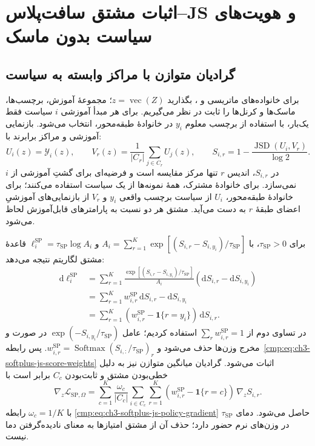 \section{اثبات مشتق سافت‌پلاس--JS و هویت‌های سیاست بدون ماسک}
\label{app:ch3-softplus-logpolicy-proofs}
\subsection{گرادیان متوازن با مراکز وابسته به سیاست}
\label{app:ch3-softplus-gradient-proof}
برای خانواده‌های ماتریسی  و ،
بگذارید $z=\operatorname{vec}(Z)$؛
مجموعهٔ آموزش، برچسب‌ها، ماسک‌ها و کرنل‌ها را ثابت
در نظر می‌گیریم. برای هر مبدأ آموزشی $i$
سیاست فقط یک‌بار، با استفاده از برچسب معلوم
$y_i$ در خانوادهٔ طبقه‌محور، انتخاب می‌شود.
بازنمایی آموزشی و مراکز برابرند با:
\[
U_i(z)=\mathscr Y_i(z),\qquad
V_r(z)=\frac1{|C_r|}\sum_{j\in C_r}U_j(z),\qquad
S_{i,r}=1-\frac{\operatorname{JSD}(U_i,V_r)}{\log2}.
\]
در $S_{i,r}$، اندیس $r$ تنها مرکز مقایسه
است و فرضیه‌ای برای گشتِ آموزشی از $i$
نمی‌سازد. برای خانوادهٔ مشترک، همهٔ
نمونه‌ها از یک سیاست استفاده می‌کنند؛
برای خانوادهٔ طبقه‌محور، $U_i$ از
سیاست برچسب واقعی $y_i$ و $V_r$
از بازنمایی‌های آموزشیِ اعضای طبقهٔ
$r$ به دست می‌آید. مشتق هر دو نسبت
به پارامترهای قابل‌آموزش لحاظ می‌شود.

برای $\tau_{\mathrm{SP}}>0$، با
$A_i=\sum_{r=1}^{K}\exp[(S_{i,r}-S_{i,y_i})/
\tau_{\mathrm{SP}}]$ و
$\ell_i^{\mathrm{SP}}=\tau_{\mathrm{SP}}\log A_i$
قاعدهٔ مشتق لگاریتم نتیجه می‌دهد:
\[
\begin{aligned}
\mathrm d\ell_i^{\mathrm{SP}}
&=\sum_{r=1}^{K}
\frac{\exp[(S_{i,r}-S_{i,y_i})/\tau_{\mathrm{SP}}]}
{A_i}(\mathrm dS_{i,r}-\mathrm dS_{i,y_i})\\
&=\sum_{r=1}^{K}w_{i,r}^{\mathrm{SP}}\,\mathrm dS_{i,r}
-\mathrm dS_{i,y_i}\\
&=\sum_{r=1}^{K}
(w_{i,r}^{\mathrm{SP}}-\mathbf1\{r=y_i\})
\,\mathrm dS_{i,r}.
\end{aligned}
\]
در تساوی دوم از $\sum_r w_{i,r}^{\mathrm{SP}}=1$
استفاده کردیم؛ عامل
$\exp(-S_{i,y_i}/\tau_{\mathrm{SP}})$
در صورت و مخرج وزن‌ها حذف می‌شود و
$w_{i,r}^{\mathrm{SP}}=\operatorname{Softmax}
(S_{i,:}/\tau_{\mathrm{SP}})_r$.
پس رابطه~\eqref{cmp:eq:ch3-softplus-js-score-weights}
اثبات می‌شود. گرادیان میانگین متوازن نیز به دلیل
خطی‌بودن مشتق و ثابت‌بودن $C_c$ برابر است با
\[
\nabla_z\mathcal L_{\mathrm{SP},\Omega}
=\sum_{c=1}^{K}\frac{\omega_c}{|C_c|}
\sum_{i\in C_c}\sum_{r=1}^{K}
(w_{i,r}^{\mathrm{SP}}-\mathbf1\{r=c\})
\,\nabla_zS_{i,r}.
\]
با $\omega_c=1/K$ رابطه
\eqref{cmp:eq:ch3-softplus-js-policy-gradient}
حاصل می‌شود. دمای $\tau_{\mathrm{SP}}$ در
وزن‌های نرم حضور دارد؛ حذف آن از مشتق امتیازها
به معنای نادیده‌گرفتن دما نیست.

